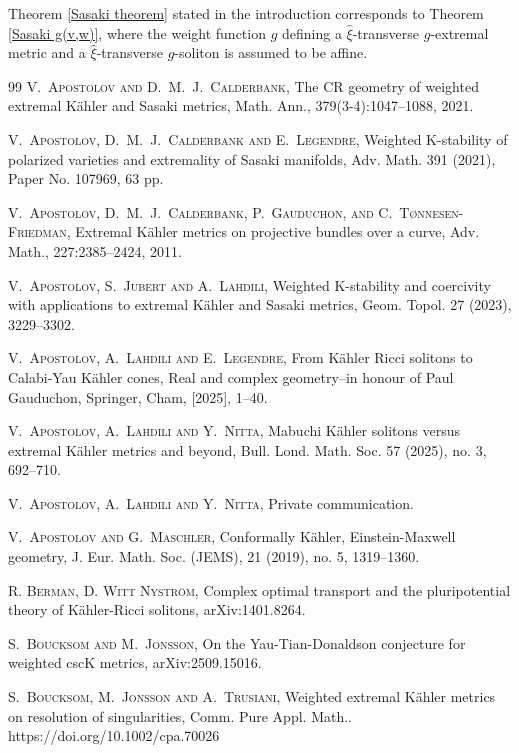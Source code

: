 \documentclass[12pt]{amsart}
\numberwithin{equation}{section}%
\theoremstyle{plain}
\theoremstyle{definition}
\newcommand{\1}{\mathbf{1}}
\begin{document}
Theorem \ref{Sasaki theorem} stated in the introduction corresponds to Theorem
\ref{Sasaki g(v,w)}, where the weight function $g$ defining a $\hat{\xi}$-transverse
$g$-extremal metric and a $\hat{\xi}$-transverse $g$-soliton
is assumed to be affine.
\begin{thebibliography}{99}
\textsc{V.~Apostolov and D.~M.~J.~Calderbank},
The CR geometry of weighted extremal K\"ahler and Sasaki metrics,
Math. Ann., 379(3-4):1047--1088, 2021.

\textsc{V.~Apostolov, D.~M.~J.~Calderbank and E.~Legendre},
Weighted K-stability of polarized varieties and extremality of Sasaki manifolds,
Adv. Math. 391 (2021), Paper No. 107969, 63 pp.

\textsc{V.~Apostolov, D.~M.~J.~Calderbank, P.~Gauduchon, and C.~T\o nnesen-Friedman},
Extremal K\"ahler metrics on projective bundles over a curve,
Adv. Math., 227:2385--2424, 2011.

\textsc{V.~Apostolov, S.~Jubert and A.~Lahdili},
Weighted K-stability and coercivity with applications to
extremal K\"ahler and Sasaki metrics,
Geom. Topol. 27 (2023), 3229--3302.

\textsc{V.~Apostolov, A.~Lahdili and E.~Legendre},
From K\"ahler Ricci solitons to Calabi-Yau K\"ahler cones,
Real and complex geometry--in honour of Paul Gauduchon,
Springer, Cham, [2025], 1--40.

\textsc{V.~Apostolov, A.~Lahdili and Y.~Nitta},
Mabuchi K\"ahler solitons versus extremal K\"ahler metrics and beyond,
Bull. Lond. Math. Soc. 57 (2025), no. 3, 692--710.

\textsc{V.~Apostolov, A.~Lahdili and Y.~Nitta},
Private communication.

\textsc{V.~Apostolov and G.~Maschler},
Conformally K\"ahler, Einstein-Maxwell geometry,
J. Eur. Math. Soc. (JEMS), 21 (2019), no. 5, 1319--1360.

\textsc{R. Berman, D. Witt Nystr\"{o}m}, 
Complex optimal transport and the pluripotential theory of
K\"{a}hler-Ricci solitons,
arXiv:1401.8264.

\textsc{S.~Boucksom and M.~Jonsson},
On the Yau-Tian-Donaldson conjecture for weighted cscK metrics,
arXiv:2509.15016.

\textsc{S.~Boucksom, M.~Jonsson and A.~Trusiani},
Weighted extremal K\"ahler metrics on resolution of singularities,
Comm. Pure Appl. Math.. https://doi.org/10.1002/cpa.70026


\end{thebibliography}
\end{document}
